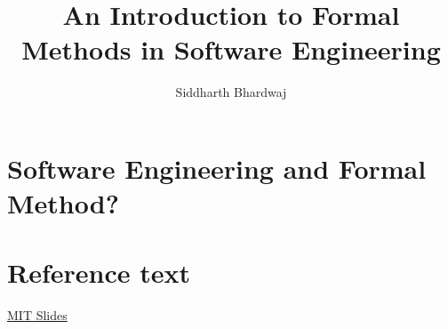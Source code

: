 \documentclass{article}
\title{An Introduction to Formal Methods in Software Engineering}
\author{Siddharth Bhardwaj}
\begin{document}
    \maketitle
    \newpage

    \section{Software Engineering and Formal Method?}

    \section{Reference text}
    \hyperlink{https://web.mit.edu/16.35/www/lecturenotes/FormalMethods.pdf}{MIT Slides}
\end{document}
